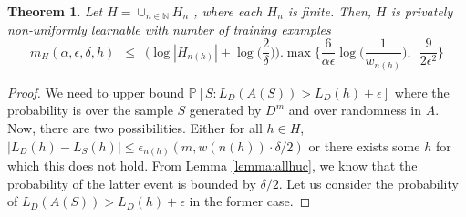 \documentclass[a4paper]{article}
\newtheorem{theorem}{Theorem}[section]
\theoremstyle{definition}
\theoremstyle{remark}
\begin{document}
\begin{theorem}
Let $H = \cup_{n\in \mathbb{N}} H_n$ , where each $H_n$ is finite. Then, $H$ is privately non-uniformly learnable with number of training examples
$$m_H(\alpha, \epsilon, \delta, h) \enspace\le\enspace \bigg(\log |H_{n(h)}| + \log\Big(\frac{2}{\delta}\Big)\bigg).\max \bigg\{\frac{6}{\alpha\epsilon}\log\bigg(\frac{1}{w_{n(h)}}\bigg), \enspace\frac{9}{2\epsilon^2}\bigg\}$$
\end{theorem}

\begin{proof}
We need to upper bound $\mathbb{P}[S : L_D (A(S)) > L_D (h) + \epsilon]$ where the probability is over the sample $S$ generated by $D^m$ and over randomness in $A$. Now, there are two possibilities. Either for all $h \in H$, $|L_D(h) - L_S(h)| \le \epsilon_{n(h)}(m, w(n(h))\cdot\delta/2)$ or there exists some $h$ for which this does not hold. From Lemma \ref{lemma:allhuc}, we know that the probability of the latter event is bounded by $\delta/2$. Let us consider the probability of $L_D(A(S)) > L_D(h)+\epsilon$ in the former case.


\end{proof}
\end{document}
